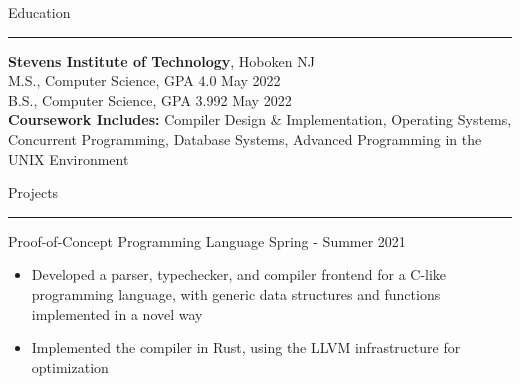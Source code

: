 \documentclass{article}
\newcommand \spacingBetweenHeadings {0.3em}
\newcommand \spacingAfterHeadings {0.5em}
\begin{document}
\vspace{\spacingBetweenHeadings}

\noindent
\huge Education\par
\vspace{0.1em}
\hrule
\Large
\vspace{\spacingAfterHeadings}
\noindent
\textbf{Stevens Institute of Technology}, Hoboken NJ\\
M.S., Computer Science, GPA 4.0
\hfill
May 2022\\
B.S., Computer Science, GPA 3.992
\hfill
May 2022\\
\textbf{Coursework Includes:} Compiler Design \& Implementation, Operating Systems,\\
Concurrent Programming, Database Systems, Advanced Programming in the UNIX Environment %




\vspace{\spacingBetweenHeadings}

\noindent
\huge Projects\par
\vspace{0.1em}
\hrule
\Large
\vspace{\spacingAfterHeadings}


\iffalse %

\noindent
Compiler for Small Imperative Language
\hfill
Spring 2020\\
\vspace{-1em}
\begin{itemize}
\item Developed a parser, typechecker, frontend, and optimizing backend for an imperative programming language as part of a class on compiler design
\item Implemented the compiler in OCaml using LLVM as a middle-end and x86 as the target architecture
\end{itemize}

\fi

\noindent
Proof-of-Concept Programming Language
\hfill
Spring - Summer 2021\\
\vspace{-1em}
\begin{itemize}
\item Developed a parser, typechecker, and compiler frontend for a C-like programming language, with generic data structures and functions implemented in a novel way
\item Implemented the compiler in Rust, using the LLVM infrastructure for optimization
\end{itemize}
\end{document}
